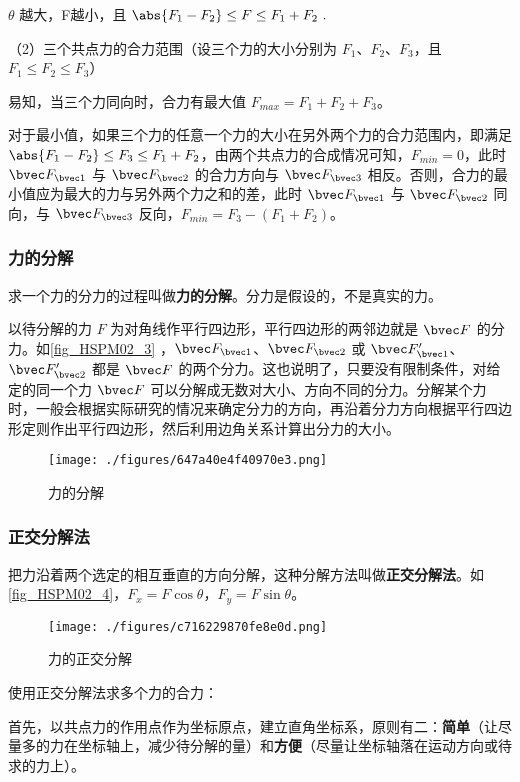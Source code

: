 $\theta$ 越大，F越小，且 $\abs{F_1-F_2}\leq F\leq F_1+F_2~.$

（2）三个共点力的合力范围（设三个力的大小分别为 $F_1$、$F_2$、$F_3$，且 $F_1\leq F_2 \leq F_3$）

易知，当三个力同向时，合力有最大值 $F_{max}=F_1+F_2+F_3$。

对于最小值，如果三个力的任意一个力的大小在另外两个力的合力范围内，即满足 $\abs{F_1-F_2}\leq F_3\leq F_1+F_2$，由两个共点力的合成情况可知，$F_{min}=0$，此时 $\bvec F_{\bvec 1}$ 与 $\bvec F_{\bvec 2}$ 的合力方向与 $\bvec F_{\bvec 3}$ 相反。否则，合力的最小值应为最大的力与另外两个力之和的差，此时 $\bvec F_{\bvec 1}$ 与 $\bvec F_{\bvec 2}$ 同向，与 $\bvec F_{\bvec 3}$ 反向，$F_{min}=F_3-(F_1+F_2)$。

\subsubsection{力的分解}
求一个力的分力的过程叫做\textbf{力的分解}。分力是假设的，不是真实的力。

以待分解的力 $F$ 为对角线作平行四边形，平行四边形的两邻边就是 $\bvec F$ 的分力。如\autoref{fig_HSPM02_3} ，$\bvec F_{\bvec 1}$、$\bvec F_{\bvec 2}$ 或 $\bvec F_{\bvec 1}'$、$\bvec F_{\bvec 2}'$ 都是 $\bvec F$ 的两个分力。这也说明了，只要没有限制条件，对给定的同一个力 $\bvec F$ 可以分解成无数对大小、方向不同的分力。分解某个力时，一般会根据实际研究的情况来确定分力的方向，再沿着分力方向根据平行四边形定则作出平行四边形，然后利用边角关系计算出分力的大小。
\begin{figure}[ht]
\centering
\texttt{[image: ./figures/647a40e4f40970e3.png]}
\caption{力的分解} \label{fig_HSPM02_3}
\end{figure}

\subsubsection{正交分解法}
把力沿着两个选定的相互垂直的方向分解，这种分解方法叫做\textbf{正交分解法}。如\autoref{fig_HSPM02_4}，$F_{x}=F\cos\theta$，$F_{y}=F\sin\theta$。
\begin{figure}[ht]
\centering
\texttt{[image: ./figures/c716229870fe8e0d.png]}
\caption{力的正交分解} \label{fig_HSPM02_4}
\end{figure}

使用正交分解法求多个力的合力：

首先，以共点力的作用点作为坐标原点，建立直角坐标系，原则有二：\textbf{简单}（让尽量多的力在坐标轴上，减少待分解的量）和\textbf{方便}（尽量让坐标轴落在运动方向或待求的力上）。

